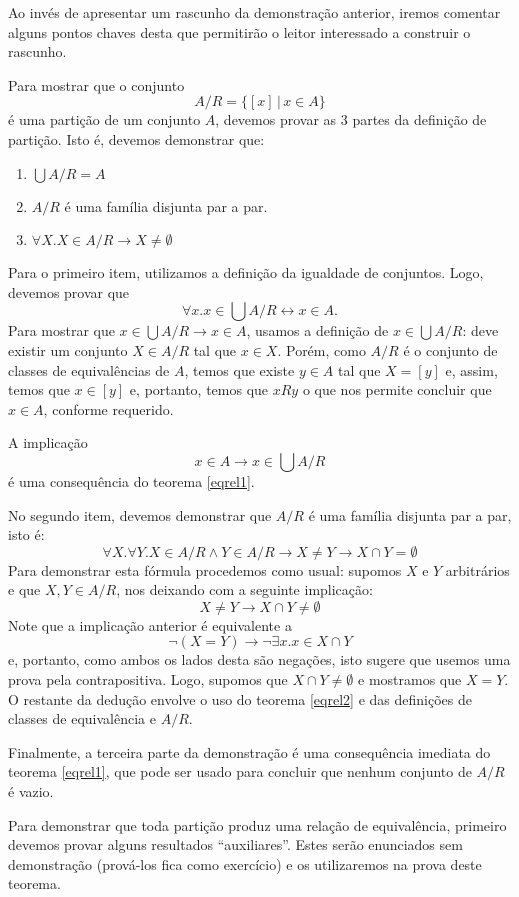 \begin{Commentary}
Ao invés de apresentar um rascunho da demonstração anterior, iremos
comentar alguns pontos chaves desta que permitirão o leitor
interessado a construir o rascunho.

Para mostrar que o conjunto \[A / R = \{ [x] \,|\, x\in A\} \] é uma
partição de um conjunto $A$, devemos provar as 3 partes da definição
de partição. Isto é, devemos demonstrar que:
\begin{enumerate}
  \item $\bigcup A / R = A$
  \item $A / R$ é uma família disjunta par a par.
  \item $\forall X. X \in A / R \to X \neq \emptyset$
\end{enumerate}
Para o primeiro item, utilizamos a definição da igualdade de
conjuntos. Logo, devemos provar que
\[
\forall x. x \in \bigcup A / R \leftrightarrow x \in A.
\]
Para mostrar que $x \in \bigcup A / R \to x \in A$, usamos a definição de $x
\in \bigcup A / R$: deve existir um conjunto $X \in A / R$ tal que $x
\in X$. Porém, como $A / R$ é o conjunto de classes de equivalências
de $A$, temos que existe $y \in A$ tal que $X = [y]$ e, assim, temos
que $x \in [y]$ e, portanto, temos que $xRy$ o que nos permite
concluir que $x \in A$, conforme requerido.

A implicação
\[
x\in A \to x \in \bigcup A / R
\]
é uma consequência do teorema \ref{eqrel1}.

No segundo item, devemos demonstrar que $A / R$ é uma família disjunta
par a par, isto é:
\[\forall X . \forall Y. X \in A /R \land Y \in A / R \to X \neq Y
\to X \cap Y = \emptyset \]
Para demonstrar esta fórmula procedemos como usual: supomos $X$ e $Y$
arbitrários e que $X,Y \in A /R$, nos deixando com a seguinte
implicação:
\[
X \neq Y \to X \cap Y \neq \emptyset
\]
Note que a implicação anterior é equivalente a
\[
\neg (X  = Y) \to \neg \exists x. x \in X \cap Y
\]
e, portanto, como ambos os lados desta são negações, isto sugere que
usemos uma prova pela contrapositiva.
Logo, supomos que $X \cap Y \neq \emptyset$ e mostramos que $X =
Y$. O restante da dedução envolve o uso do teorema \ref{eqrel2} e das
definições de classes de equivalência e $A / R$.

Finalmente, a terceira parte da demonstração é uma consequência
imediata do teorema \ref{eqrel1}, que pode ser usado para concluir que
nenhum conjunto de $A / R$ é vazio.
\end{Commentary}
Para demonstrar que toda partição produz uma relação de equivalência,
primeiro
devemos provar alguns
resultados ``auxiliares''. Estes serão enunciados sem demonstração
(prová-los fica como exercício) e os utilizaremos na prova deste
teorema.

